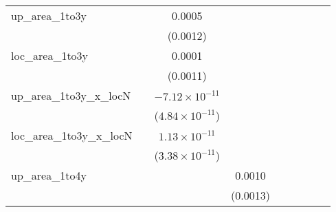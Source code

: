 \begin{tabular}{lcccccccc}
   up\_area\_1to3y               &                          & 0.0005                   &                               &                               &                             &                          &                          &   \\   
                                 &                          & (0.0012)                 &                               &                               &                             &                          &                          &   \\   
   loc\_area\_1to3y              &                          & 0.0001                   &                               &                               &                             &                          &                          &   \\   
                                 &                          & (0.0011)                 &                               &                               &                             &                          &                          &   \\   
   up\_area\_1to3y\_x\_locN      &                          & $-7.12\times 10^{-11}$   &                               &                               &                             &                          &                          &   \\   
                                 &                          & ($4.84\times 10^{-11}$)  &                               &                               &                             &                          &                          &   \\   
   loc\_area\_1to3y\_x\_locN     &                          & $1.13\times 10^{-11}$    &                               &                               &                             &                          &                          &   \\   
                                 &                          & ($3.38\times 10^{-11}$)  &                               &                               &                             &                          &                          &   \\   
   up\_area\_1to4y               &                          &                          & 0.0010                        &                               &                             &                          &                          &   \\   
                                 &                          &                          & (0.0013)                      &                               &                             &                          &                          &   \\   

\end{tabular}

